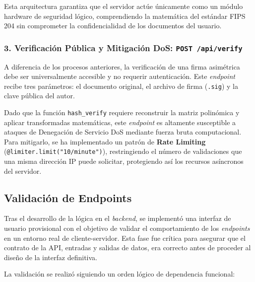 \documentclass[11pt, a4paper]{report}
\theoremstyle{definition}
\begin{document}
Esta arquitectura garantiza que el servidor actúe únicamente como un módulo hardware de seguridad lógico, comprendiendo la matemática del estándar FIPS 204 sin comprometer la confidencialidad de los documentos del usuario.

\subsubsection{3. Verificación Pública y Mitigación DoS: \texttt{POST /api/verify}}

A diferencia de los procesos anteriores, la verificación de una firma asimétrica debe ser universalmente accesible y no requerir autenticación. Este \textit{endpoint} recibe tres parámetros: el documento original, el archivo de firma (\texttt{.sig}) y la clave pública del autor.

Dado que la función \texttt{hash\_verify} requiere reconstruir la matriz polinómica y aplicar transformadas matemáticas, este \textit{endpoint} es altamente susceptible a ataques de Denegación de Servicio DoS mediante fuerza bruta computacional. Para mitigarlo, se ha implementado un patrón de \textbf{Rate Limiting} (\texttt{@limiter.limit("10/minute")}), restringiendo el número de validaciones que una misma dirección IP puede solicitar, protegiendo así los recursos asíncronos del servidor.



\subsection{Validación de Endpoints}
\label{subsec:mvp_conexion}

Tras el desarrollo de la lógica en el \textit{backend}, se implementó una interfaz de usuario provisional con el objetivo de validar el comportamiento de los \textit{endpoints} en un entorno real de cliente-servidor. Esta fase fue crítica para asegurar que el contrato de la API, entradas y salidas de datos, era correcto antes de proceder al diseño de la interfaz definitiva.

La validación se realizó siguiendo un orden lógico de dependencia funcional:
\end{document}
